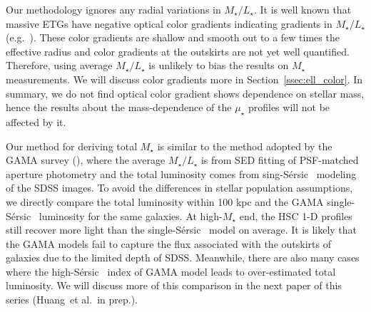 \documentclass[a4paper,fleqn,usenatbib]{mnras}
\def\etal{{\ et al.~}}
\def\ser{{S\'{e}rsic\ }}
\def\mstar{{$M_{\star}$}}
\def\m2l{{$M_{\star}/L_{\star}$}}
\def\mden{{$\mu_{\star}$}}
\begin{document}
    Our methodology ignores any radial variations in \m2l{}. 
    It is well known that massive ETGs have negative optical color gradients 
    indicating gradients in \m2l{} (e.g.\ \citealt{Carollo1993, Davies1993, 
    LaBarbera2012, DSouza2015}).
    These color gradients are shallow and smooth out to a few times the effective 
    radius and color gradients at the outskirts are not yet well quantified.
    Therefore, using average \m2l{} is unlikely to bias the results on \mstar{}
    measurements.  
    We will discuss color gradients more in Section~\ref{ssec:ell_color}. 
    In summary, we do not find optical color gradient shows dependence on stellar
    mass, hence the results about the mass-dependence of the \mden{} profiles will 
    not be affected by it. 
    
    
    Our method for deriving total \mstar{} is similar to the method adopted by the 
    GAMA survey (\citealt{Taylor2011, Kelvin2012}), where the average \m2l{} is from 
    SED fitting of PSF-matched aperture photometry and the total luminosity comes from 
    sing-\ser{} modeling of the SDSS images. 
    To avoid the differences in stellar population assumptions, we directly compare the 
    total luminosity within 100 kpc and the GAMA single-\ser{} luminosity for the same
    galaxies. 
    At high-\mstar{} end, the HSC 1-D profiles still recover more light than the 
    single-\ser{} model on average.
    It is likely that the GAMA models fail to capture the flux associated with the 
    outskirts of galaxies due to the limited depth of SDSS.  
    Meanwhile, there are also many cases where the high-\ser{} index of GAMA model leads 
    to over-estimated total luminosity. 
    We will discuss more of this comparison in the next paper of this series 
    (Huang\etal in prep.).
        
   

\end{document}
